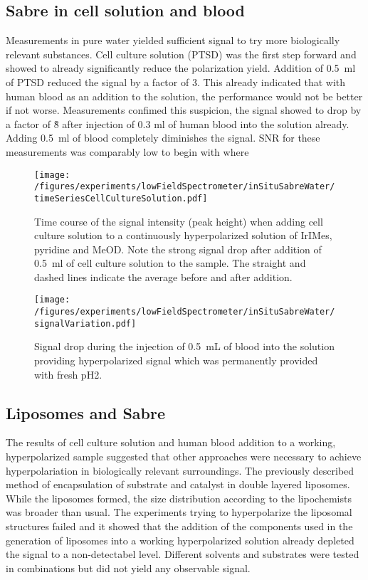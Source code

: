     \subsection{Sabre in cell solution and blood}
        Measurements in pure water yielded sufficient signal to try more biologically relevant substances. Cell culture solution (PTSD) was the first step forward and showed to already significantly reduce the polarization yield. Addition of \SI{0.5}{\milli\litre} of PTSD reduced the signal by a factor of 3. This already indicated that with human blood as an addition to the solution, the performance would not be better if not worse. Measurements confimed this suspicion, the signal showed to drop by a factor of \~8 after injection of 0.3 ml of human blood into the solution already. Adding \SI{0.5}{\milli\litre} of blood completely diminishes the signal. SNR for these measurements was comparably low to begin with where
        \begin{figure}
            \texttt{[image: /figures/experiments/lowFieldSpectrometer/inSituSabreWater/timeSeriesCellCultureSolution.pdf]}
            \caption[Cell culture solution addition to hyperpolarized signal]{Time course of the signal intensity (peak height) when adding cell culture solution to a continuously hyperpolarized solution of IrIMes, pyridine and MeOD. Note the strong signal drop after addition of \SI{0.5}{\milli\litre} of cell culture solution to the sample. The straight and dashed lines indicate the average before and after addition.}
            \label{chap:MaterialsAndMethods:bloodInjection}
        \end{figure}
        \begin{figure}
            \texttt{[image: /figures/experiments/lowFieldSpectrometer/inSituSabreWater/signalVariation.pdf]}
            \label{chap:MaterialsAndMethods:bloodInjection2}
            \caption[Blood addition to hyperpolarized signal]{Signal drop during the injection of \SI{0.5}{\milli\liter} of blood into the solution providing hyperpolarized signal which was permanently provided with fresh pH2.}
        \end{figure}
    \subsection{Liposomes and Sabre}
        The results of cell culture solution and human blood addition to a working, hyperpolarized sample suggested that other approaches were necessary to achieve hyperpolariation in biologically relevant surroundings. The previously described method of encapsulation of substrate and catalyst in double layered liposomes. While the liposomes formed, the size distribution according to the lipochemists was broader than usual.  The experiments trying to hyperpolarize the liposomal structures failed and it showed that the addition of the components used in the generation of liposomes into a working hyperpolarized solution already depleted the signal to a non-detectabel level. Different solvents and substrates were tested in combinations but did not yield any observable signal.
